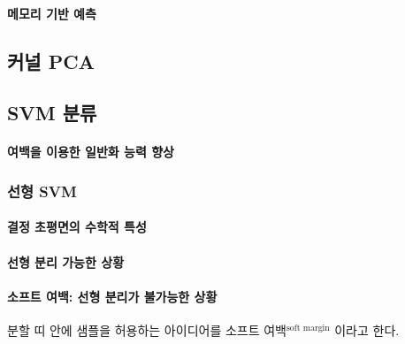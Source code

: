 \documentclass [12pt] {oblivoir}
\let\oldsubsubsection=\subsubsection
\renewcommand{\subsubsection}
{
  \filbreak
  \oldsubsubsection
}
\begin{document}
\vspace{3mm}

\paragraph*{메모리 기반 예측}\mbox{}

\vspace{3mm}

\subsection{커널 PCA}

\subsection{SVM 분류}

\paragraph*{여백을 이용한 일반화 능력 향상}\mbox{}

\vspace{3mm}

\subsubsection{선형 SVM}

\paragraph*{결정 초평면의 수학적 특성}\mbox{}

\vspace{3mm}

\paragraph*{선형 분리 가능한 상황}\mbox{}

\vspace{3mm}

\paragraph*{소프트 여백: 선형 분리가 불가능한 상황}\mbox{}

분할 띠 안에 샘플을 허용하는 아이디어를 소프트 여백$^{\text{soft margin}}$ 이라고 한다.

\vspace{3mm}
\end{document}
